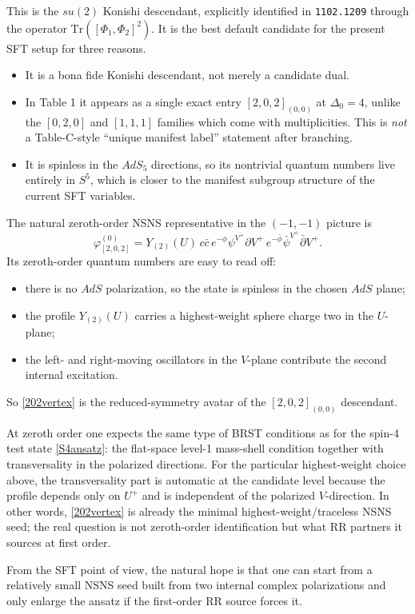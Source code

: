 \documentclass[12pt]{article}
\def\be{\begin{equation}}
\def\ee{\end{equation}}
\newcommand{\D}{\ensuremath{\Delta}}
\newcommand{\Tr}{\mathrm{Tr}}
\begin{document}
This is the $su(2)$ Konishi descendant, explicitly identified in \texttt{1102.1209} through the operator
$\Tr([\Phi_1,\Phi_2]^2)$.
It is the best default candidate for the present SFT setup for three reasons.
\begin{itemize}
\item It is a bona fide Konishi descendant, not merely a candidate dual.
\item In Table 1 it appears as a single exact entry $[2,0,2]_{(0,0)}$ at $\D_0=4$, unlike the
$[0,2,0]$ and $[1,1,1]$ families which come with multiplicities. This is \emph{not} a Table-C-style
``unique manifest label'' statement after branching.
\item It is spinless in the $AdS_5$ directions, so its nontrivial quantum numbers live entirely in
$S^5$, which is closer to the manifest subgroup structure of the current SFT variables.
\end{itemize}

The natural zeroth-order NSNS representative in the $(-1,-1)$ picture is
\be
\varphi^{(0)}_{[2,0,2]}
=Y_{(2)}(U)\, c\bar c\,
e^{-\phi}\psi^{V^+}\partial V^+\,
e^{-\bar\phi}\bar\psi^{V^+}\bar\partial V^+.
\label{202vertex}
\ee
Its zeroth-order quantum numbers are easy to read off:
\begin{itemize}
\item there is no $AdS$ polarization, so the state is spinless in the chosen $AdS$ plane;
\item the profile $Y_{(2)}(U)$ carries a highest-weight sphere charge two in the $U$-plane;
\item the left- and right-moving oscillators in the $V$-plane contribute the second internal excitation.
\end{itemize}
So \eqref{202vertex} is the reduced-symmetry avatar of the $[2,0,2]_{(0,0)}$ descendant.

At zeroth order one expects the same type of BRST conditions as for the spin-4 test state
\eqref{S4ansatz}: the flat-space level-1 mass-shell condition together with transversality in the
polarized directions. For the particular highest-weight choice above, the transversality part is automatic
at the candidate level because the profile depends only on $U^+$ and is independent of the polarized
$V$-direction. In other words, \eqref{202vertex} is already the minimal highest-weight/traceless NSNS seed;
the real question is not zeroth-order identification but what RR partners it sources at first order.

From the SFT point of view, the natural hope is that one can start from a relatively small NSNS seed
built from two internal complex polarizations and only enlarge the ansatz if the first-order RR source
forces it.
\end{document}

